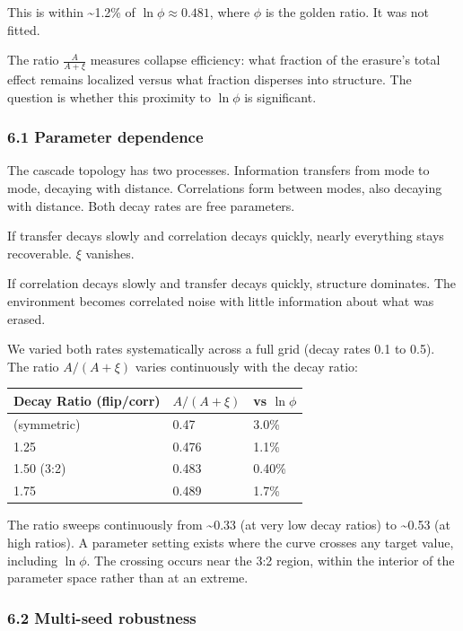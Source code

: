 \documentclass[
  11pt,
  a4paper]{article}
\begin{document}
This is within \textasciitilde1.2\% of \(\ln \phi \approx 0.481\), where
\(\phi\) is the golden ratio. It was not fitted.

The ratio \(\frac{A}{A+\xi}\) measures collapse efficiency: what
fraction of the erasure's total effect remains localized versus what
fraction disperses into structure. The question is whether this
proximity to \(\ln\phi\) is significant.

\subsubsection{6.1 Parameter dependence}\label{parameter-dependence}

The cascade topology has two processes. Information transfers from mode
to mode, decaying with distance. Correlations form between modes, also
decaying with distance. Both decay rates are free parameters.

If transfer decays slowly and correlation decays quickly, nearly
everything stays recoverable. \(\xi\) vanishes.

If correlation decays slowly and transfer decays quickly, structure
dominates. The environment becomes correlated noise with little
information about what was erased.

We varied both rates systematically across a full grid (decay rates 0.1
to 0.5). The ratio \(A/(A+\xi)\) varies continuously with the decay
ratio:

\begin{longtable}[]{@{}lll@{}}
\toprule\noalign{}
Decay Ratio (flip/corr) & \(A/(A+\xi)\) & vs \(\ln\phi\) \\
\midrule\noalign{}
\endhead
\bottomrule\noalign{}
\endlastfoot
1.00 (symmetric) & 0.47 & 3.0\% \\
1.25 & 0.476 & 1.1\% \\
1.50 (3:2) & 0.483 & 0.40\% \\
1.75 & 0.489 & 1.7\% \\
\end{longtable}

The ratio sweeps continuously from \textasciitilde0.33 (at very low
decay ratios) to \textasciitilde0.53 (at high ratios). A parameter
setting exists where the curve crosses any target value, including
\(\ln\phi\). The crossing occurs near the 3:2 region, within the
interior of the parameter space rather than at an extreme.

\subsubsection{6.2 Multi-seed robustness}\label{multi-seed-robustness}
\end{document}
